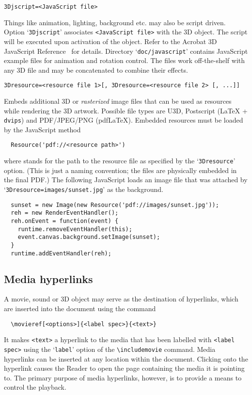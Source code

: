 \documentclass[a4paper]{article}
\begin{document}
\begin{verbatim}
3Djscript=<JavaScript file>
\end{verbatim}
Things like animation, lighting, background etc. may also be script driven. Option `\verb+3Djscript+' associates \verb+<JavaScript file>+ with the 3D object. The script will be executed upon activation of the object. Refer to the Acrobat 3D JavaScript Reference~\cite{jscript3D} for details. Directory `\verb+doc/javascript+' contains JavaScript example files for animation and rotation control. The files work off-the-shelf with any 3D file and may be concatenated to combine their effects.
\begin{verbatim}
3Dresource=<resource file 1>[, 3Dresource=<resource file 2> [, ...]]
\end{verbatim}
Embeds additional 3D or \emph{rasterized} image files that can be used as resources while rendering the 3D artwork. Possible file types are U3D, Postscript (\LaTeX{} + \verb+dvips+) and PDF/JPEG/PNG (pdf\LaTeX). Embedded resources must be loaded by the JavaScript method
\begin{verbatim}
  Resource('pdf://<resource path>')
\end{verbatim}
where {\tt<resource path>} stands for the path to the resource file as specified by the `\verb+3Dresource+' option. (This is just a naming convention; the files are physically embedded in the final PDF.) The following JavaScript loads an image file that was attached by `\verb+3Dresource=images/sunset.jpg+' as the background.
\begin{verbatim}
  sunset = new Image(new Resource('pdf://images/sunset.jpg')); 
  reh = new RenderEventHandler(); 
  reh.onEvent = function(event) { 
    runtime.removeEventHandler(this); 
    event.canvas.background.setImage(sunset); 
  }
  runtime.addEventHandler(reh); 
\end{verbatim}

\subsection{Media hyperlinks}\label{hyperlinks}
A movie, sound or 3D object may serve as the destination of hyperlinks, which are inserted into the document using the command
\begin{verbatim}
  \movieref[<options>]{<label spec>}{<text>}
\end{verbatim}
It makes \verb+<text>+ a hyperlink to the media that has been labelled with \verb+<label+ \verb+spec>+ using the `\verb+label+' option of the \verb+\includemovie+ command. Media hyperlinks can be inserted at any location within the document. Clicking onto the hyperlink causes the Reader to open the page containing the media it is pointing to. The primary purpose of media hyperlinks, however, is to provide a means to control the playback.
\end{document}
